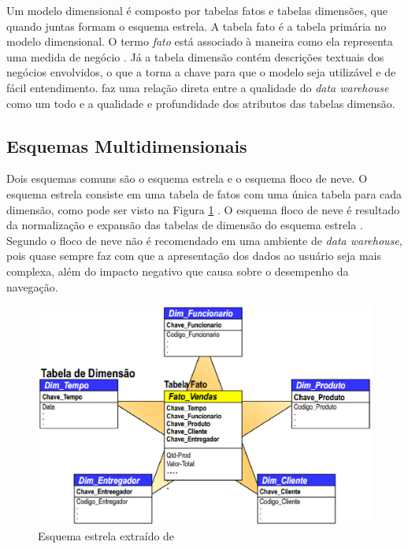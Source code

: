 Um modelo dimensional é composto por tabelas fatos e tabelas dimensões, que quando juntas formam o esquema estrela. A tabela fato é a tabela primária no modelo dimensional. O termo \textit{fato} está associado à maneira como ela representa uma medida de negócio \cite{Kimball2002}. Já a tabela dimensão contém descrições textuais dos negócios envolvidos, o que a torna a chave para que o modelo seja utilizável e de fácil entendimento.  faz uma relação direta entre a qualidade do \textit{data warehouse} como um todo e a qualidade e profundidade dos atributos das tabelas dimensão.

\subsection{Esquemas Multidimensionais}

Dois esquemas comuns são o esquema estrela e o esquema floco de neve. O esquema estrela consiste em uma tabela de fatos com uma única tabela para cada dimensão, como pode ser visto na Figura \ref{fig:estrela} \cite{elmasri_sistemas_2011}. O esquema floco de neve é resultado da normalização e expansão das tabelas de dimensão do esquema estrela \cite{ballard_dimensional_2006}. Segundo  o floco de neve não é recomendado em uma ambiente de \textit{data warehouse}, pois quase sempre faz com que a apresentação dos dados ao usuário seja mais complexa, além do impacto negativo que causa sobre o desempenho da navegação.

 
\begin{figure}[h!]
\centering
\includegraphics[keepaspectratio=false,scale=0.50]{figuras/figuras_matheus/star.eps}
\caption{Esquema estrela extraído de }
\label{fig:estrela}
\end{figure}
\FloatBarrier


